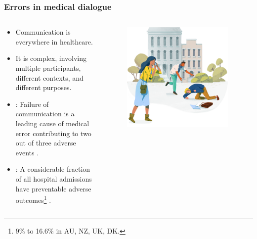 \begin{frame}
    \frametitle{Errors in medical dialogue}
    \begin{columns}
        \begin{column}{0.5\textwidth}
            \begin{itemize}
                \item <1-> Communication is everywhere in healthcare. 
                \item <1-> It is complex, involving multiple participants, different contexts, and different purposes.
                \vspace{1em}
                \item <2-> : Failure of communication is a leading cause of medical error contributing to two out of three adverse events \cite{starmer_changes_2014}.
                \item <2-> : A considerable fraction of all hospital admissions have preventable adverse outcomes\footnote<2>{9\% to 16.6\% in AU, NZ, UK, DK.} \cite{carver_medical_2024}.
            \end{itemize}
        \end{column}
        \begin{column}{0.5\textwidth}
            \begin{figure}
                \centering
                \includegraphics[width=0.95\textwidth]{figures/corti_sketch_emergency.png}
            \end{figure}
        \end{column}
    \end{columns}
\end{frame}


